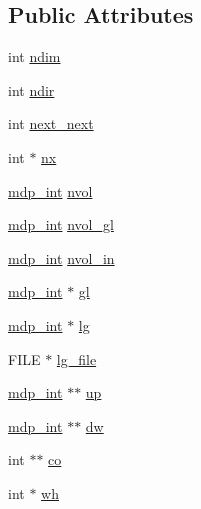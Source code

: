 \subsection*{Public Attributes}
\begin{DoxyCompactItemize}
\item 
int \hyperlink{classmdp__lattice_a215127d8822ab086ff06fdbc815fae91}{ndim}
\item 
int \hyperlink{classmdp__lattice_ace466601bc3fb9815648d775793985eb}{ndir}
\item 
int \hyperlink{classmdp__lattice_afc7199a6a019e3bfdb40f1367baf36e4}{next\_\-next}
\item 
int $\ast$ \hyperlink{classmdp__lattice_a2cdf4a8e76d5677dbcf7c0030daa3e37}{nx}
\item 
\hyperlink{mdp__global__vars_8h_aaa1ad9d0dcd2124aa5af0120d9954174}{mdp\_\-int} \hyperlink{classmdp__lattice_a602bacd9e2e1dd56819b118cf52672be}{nvol}
\item 
\hyperlink{mdp__global__vars_8h_aaa1ad9d0dcd2124aa5af0120d9954174}{mdp\_\-int} \hyperlink{classmdp__lattice_a98aee146f9cea665a75ca70b78ee85fa}{nvol\_\-gl}
\item 
\hyperlink{mdp__global__vars_8h_aaa1ad9d0dcd2124aa5af0120d9954174}{mdp\_\-int} \hyperlink{classmdp__lattice_ae8595ccbca06ce37aa14b56d27010b6b}{nvol\_\-in}
\item 
\hyperlink{mdp__global__vars_8h_aaa1ad9d0dcd2124aa5af0120d9954174}{mdp\_\-int} $\ast$ \hyperlink{classmdp__lattice_aac1057478186764ece27e33d1a215a7d}{gl}
\item 
\hyperlink{mdp__global__vars_8h_aaa1ad9d0dcd2124aa5af0120d9954174}{mdp\_\-int} $\ast$ \hyperlink{classmdp__lattice_a1f2238902be88b61a3cc677f912210ea}{lg}
\item 
FILE $\ast$ \hyperlink{classmdp__lattice_a3c0a480cd7f6bf31cd8dbffd87e57ac3}{lg\_\-file}
\item 
\hyperlink{mdp__global__vars_8h_aaa1ad9d0dcd2124aa5af0120d9954174}{mdp\_\-int} $\ast$$\ast$ \hyperlink{classmdp__lattice_a14892e721f56e142037c511bf6543e8d}{up}
\item 
\hyperlink{mdp__global__vars_8h_aaa1ad9d0dcd2124aa5af0120d9954174}{mdp\_\-int} $\ast$$\ast$ \hyperlink{classmdp__lattice_a5fb45161a272c08b81eafca224546673}{dw}
\item 
int $\ast$$\ast$ \hyperlink{classmdp__lattice_ad4cffbef2302b39176943a783c8f4ecc}{co}
\item 
int $\ast$ \hyperlink{classmdp__lattice_adeee5743b0c437ec58026c98a0a3229f}{wh}
\item 
$$
\end{DoxyCompactItemize}
